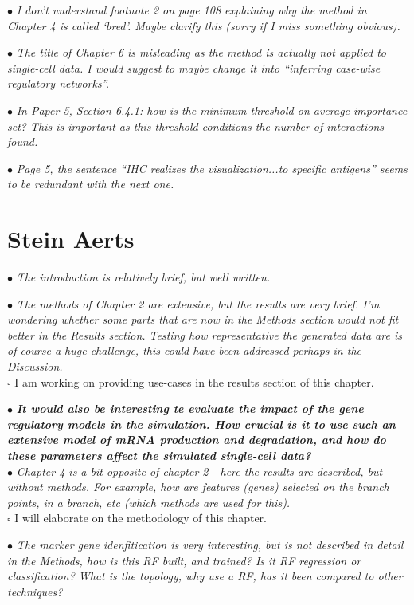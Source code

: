 \documentclass[10pt]{article}
\newcommand{\todo}{$\square$}
\newcommand{\exam}[2][\  ]{\hspace{0pt}\marginpar{\color{myred}#1}$\bullet$ \textit{#2}}
\newcommand{\imp}[1]{\textbf{#1}}
\newcommand{\answ}[1]{{\color{myblue} $\triangleright$ #1}}
\newcommand{\task}[2][\todo]{{\color{myblue} #1 #2}}
\newcommand{\bigexclaim}{\raisebox{-0.1em}{\BigTriangleUp}\hspace{-0.32em}\llap{\small\textbf{!}}\hspace{0.32em}}
\newcommand{\tagimp}{\bigexclaim}
\newcommand{\tagtime}{{\Large $\hourglass$}}
\begin{document}
\exam{I don’t understand footnote 2 on page 108 explaining why the method in Chapter 4 is called
	‘bred’. Maybe clarify this (sorry if I miss something obvious).}

\exam{The title of Chapter 6 is misleading as the method is actually not applied to single-cell data.
	I would suggest to maybe change it into “inferring case-wise regulatory networks”.}

\exam{In Paper 5, Section 6.4.1: how is the minimum threshold on average importance set? This is
	important as this threshold conditions the number of interactions found.}

\exam{Page 5, the sentence “IHC realizes the visualization...to specific antigens” seems to be
	redundant with the next one.}
 


\section{Stein Aerts}


\exam{The introduction is relatively brief, but well
written.}

\exam{The methods of Chapter 2 are extensive, but the results are very brief. I’m wondering whether
some parts that are now in the Methods section would not fit better in the Results section. Testing how
representative the generated data are is of course a huge challenge, this could have been addressed
perhaps in the Discussion.} \\
\task{I am working on providing use-cases in the results section of this chapter.}


\exam[\tagimp \tagtime]{\imp{It would also be interesting te evaluate the impact of the gene regulatory
models in the simulation. How crucial is it to use such an extensive model of mRNA production and
degradation, and how do these parameters affect the simulated single-cell data?}} \\

\exam{Chapter 4 is a bit opposite
of chapter 2 - here the results are described, but without methods. For example, how are features
(genes) selected on the branch points, in a branch, etc (which methods are used for this).} \\
\task{I will elaborate on the methodology of this chapter.}

\exam{The marker gene idenfitication is very interesting, but is not described in detail in the Methods, how
is this RF built, and trained? Is it RF regression or classification? What is the topology, why use a RF,
has it been compared to other techniques?}
\end{document}
